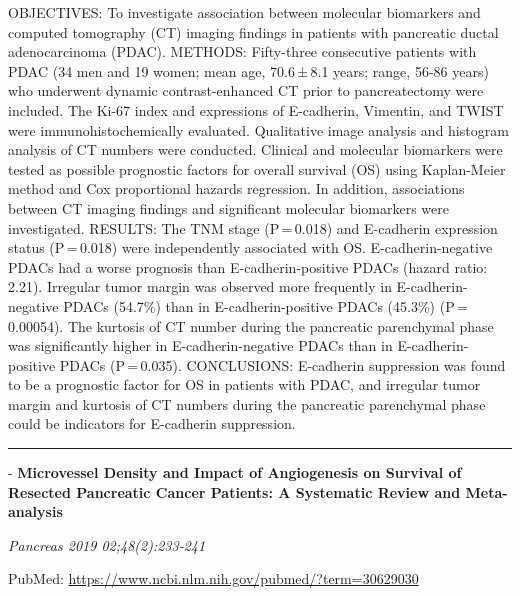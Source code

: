 \documentclass[]{article}
\begin{document}
OBJECTIVES: To investigate association between molecular biomarkers and
computed tomography (CT) imaging findings in patients with pancreatic
ductal adenocarcinoma (PDAC). METHODS: Fifty-three consecutive patients
with PDAC (34 men and 19 women; mean age, 70.6\,±\,8.1 years; range,
56-86 years) who underwent dynamic contrast-enhanced CT prior to
pancreatectomy were included. The Ki-67 index and expressions of
E-cadherin, Vimentin, and TWIST were immunohistochemically evaluated.
Qualitative image analysis and histogram analysis of CT numbers were
conducted. Clinical and molecular biomarkers were tested as possible
prognostic factors for overall survival (OS) using Kaplan-Meier method
and Cox proportional hazards regression. In addition, associations
between CT imaging findings and significant molecular biomarkers were
investigated. RESULTS: The TNM stage (P\,=\,0.018) and E-cadherin
expression status (P\,=\,0.018) were independently associated with OS.
E-cadherin-negative PDACs had a worse prognosis than E-cadherin-positive
PDACs (hazard ratio: 2.21). Irregular tumor margin was observed more
frequently in E-cadherin-negative PDACs (54.7\%) than in
E-cadherin-positive PDACs (45.3\%) (P\,=\,0.00054). The kurtosis of CT
number during the pancreatic parenchymal phase was significantly higher
in E-cadherin-negative PDACs than in E-cadherin-positive PDACs
(P\,=\,0.035). CONCLUSIONS: E-cadherin suppression was found to be a
prognostic factor for OS in patients with PDAC, and irregular tumor
margin and kurtosis of CT numbers during the pancreatic parenchymal
phase could be indicators for E-cadherin suppression.

{}

{}

\begin{center}\rule{0.5\linewidth}{\linethickness}\end{center}

 - \textbf{Microvessel Density and Impact of Angiogenesis on Survival of
Resected Pancreatic Cancer Patients: A Systematic Review and
Meta-analysis}

\emph{Pancreas 2019 02;48(2):233-241}

PubMed: \url{https://www.ncbi.nlm.nih.gov/pubmed/?term=30629030}
\end{document}
